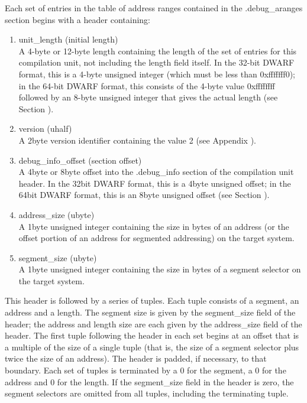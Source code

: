 Each set of entries in the table of address ranges contained
in the .debug\_aranges section begins with a header containing:

\begin{enumerate}[1.]

\item unit\_length (initial length) \\
A 4-byte or 12-byte length containing the length of the
set of entries for this compilation unit, not including the
length field itself. In the 32-bit DWARF format, this is a
4-byte unsigned integer (which must be less than 0xfffffff0);
in the 64-bit DWARF format, this consists of the 4-byte value
0xffffffff followed by an 8-byte unsigned integer that gives
the actual length 
(see Section ).

\item version (uhalf) \\
A 2\dash byte version identifier containing the value 2 
(see Appendix ). 

\item debug\_info\_offset (section offset) \\
A 4\dash byte or 8\dash byte offset into the .debug\_info section of
the compilation unit header. In the 32\dash bit DWARF format,
this is a 4\dash byte unsigned offset; in the 64\dash bit DWARF format,
this is an 8\dash byte unsigned offset 
(see Section ).

\item address\_size (ubyte) \\
A 1\dash byte unsigned integer containing the size in bytes of an
address (or the offset portion of an address for segmented
addressing) on the target system.

\item segment\_size (ubyte) \\
A 1\dash byte unsigned integer containing the size in bytes of a
segment selector on the target system.

\end{enumerate}

This header is followed by a series of tuples. Each tuple
consists of a segment, an address and a length. 
The segment
size is given by the segment\_size field of the header; the
address and length size are each given by the address\_size
field of the header. 
The first tuple following the header in
each set begins at an offset that is a multiple of the size
of a single tuple (that is, the size of a segment selector
plus twice the size of an address). 
The header is padded, if
necessary, to that boundary. Each set of tuples is terminated
by a 0 for the segment, a 0 for the address and 0 for the
length. If the segment\_size field in the header is zero,
the segment selectors are omitted from all tuples, including
the terminating tuple.


